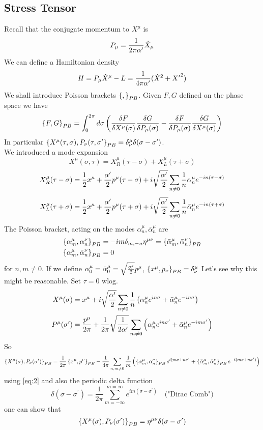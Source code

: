 \documentclass{article}
\begin{document}
\subsection{Stress Tensor}
Recall that the conjugate momentum to $X^\mu$ is 
\[
P_\mu = \frac{1}{2\pi\cst} \dot{X}_\mu
\]
We can define a Hamiltonian density 
\[
H = P_\mu \dot{X}^\mu - L = \frac{1}{4\pi\cst}(\dot{X}^2 + {X^\prime}^2)
\]
We shall introduce Poisson brackets $\pb[]{}$. Given $F,G$ defined on the phase space we have 
\[
\pb[F]{G} = \int_0^{2\pi} d\sigma \left( \frac{\delta F}{\delta X^\mu(\sigma)} \frac{\delta G}{\delta P_\mu(\sigma)} - \frac{\delta F}{\delta P_\mu(\sigma)}\frac{\delta G}{\delta X^\mu(\sigma)} \right) 
\]
In particular $\pb[X^\mu(\tau,\sigma)]{P_\nu(\tau,\sigma^\prime}=\delta^\mu_\nu \delta(\sigma-\sigma^\prime)$.\\
We introduced a mode expansion 
\[
X^\mu(\sigma,\tau) = X^\mu_R(\tau-\sigma) + X^\mu_L(\tau+\sigma)
\]
\[
X^\mu_R(\tau-\sigma) = \frac{1}{2} x^\mu + \frac{\cst}{2} p^\mu (\tau-\sigma) + i\sqrt{\frac{\cst}{2}} \sum_{n\neq0} \frac{1}{n} \alpha^\mu_n e^{-in(\tau-\sigma)}
\]
\[
X^\mu_L(\tau+\sigma) = \frac{1}{2} x^\mu + \frac{\cst}{2} p^\mu (\tau+\sigma) + i\sqrt{\frac{\cst}{2}} \sum_{n\neq0} \frac{1}{n} \bar{\alpha}^\mu_n e^{-in(\tau+\sigma)}
\]
The Poisson bracket, acting on the modes $\alpha^\mu_n, \bar{\alpha}^\mu_n$ are 
\begin{align} \label{eq:2}
\pb[\alpha^\mu_m]{\alpha^\nu_n} &= -im \delta_{m,-n} \eta^{\mu\nu} = \pb[\bar{\alpha}^\mu_m]{\bar{\alpha}^\nu_n} \\
\pb[\alpha^\mu_m]{\bar{\alpha}^\nu_n} &= 0
\end{align}
for $n,m\neq0$. If we define $\alpha^\mu_0=\bar{\alpha}^\mu_0 = \sqrt{\frac{\cst}{2}}p^\mu$, $\pb[x^\mu]{p_\nu}=\delta^\mu_\nu$
Let's see why this might be reasonable. Set $\tau=0$ wlog. 
\begin{align*}
X^\mu(\sigma) &= x^\mu + i\sqrt{\frac{\cst}{2}} \sum_{n\neq0} \frac{1}{n} \left( \alpha^\mu_n e^{in\sigma} + \bar{\alpha}^\mu_n e^{-in\sigma} \right) \\ 
P^\mu(\sigma^\prime) &= \frac{p^\mu}{2\pi} + \frac{1}{2\pi}\sqrt{\frac{1}{2\cst}} \sum_{m\neq0} \left( \alpha^\mu_n e^{in\sigma^\prime} + \bar{\alpha}^\mu_n e^{-im\sigma^\prime} \right)
\end{align*}
So 
\[
\pb[X^\mu(\sigma)]{P_\nu(\sigma^\prime)} = \frac{1}{2\pi} \pb[x^\mu]{p^\nu} - \frac{1}{4\pi} \sum_{n,m\neq0} \frac{1}{m} \left( \pb[\alpha^\mu_m]{\alpha^\nu_n} e^{i(m\sigma+n\sigma^\prime}+\pb[\bar{\alpha}^\mu_m]{\bar{\alpha}^\nu_n}e^{-i(m\sigma+n\sigma^\prime)} \right)
\]
using \ref{eq:2} and also the periodic delta function 
\[
\delta(\sigma-\sigma^\prime)=\frac{1}{2\pi} \sum_{m=-\infty}^{m=\infty} e^{im(\sigma-\sigma^\prime)} \quad \text{("Dirac Comb")}
\]
one can show that 
\[
\pb[X^\mu(\sigma)]{P_\nu(\sigma^\prime)} = \eta^{\mu\nu} \delta(\sigma-\sigma^\prime)
\]
\end{document}
